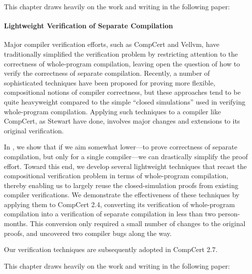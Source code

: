 
This chapter draws heavily on the work and writing in the following paper:



\paragraph{Lightweight Verification of Separate Compilation}

Major compiler verification efforts, such as CompCert and Vellvm, have traditionally simplified the
verification problem by restricting attention to the correctness of whole-program compilation,
leaving open the question of how to verify the correctness of separate compilation.  Recently, a
number of sophisticated techniques have been proposed for proving more flexible, compositional
notions of compiler correctness, but these approaches tend to be quite heavyweight compared to the
simple ``closed simulations'' used in verifying whole-program compilation.  Applying such techniques
to a compiler like CompCert, as Stewart \etal{} have done, involves major changes and extensions to
its original verification.

In , we show that if we aim somewhat lower---to prove correctness of separate
compilation, but only for a single compiler---we can drastically simplify the proof effort.  Toward
this end, we develop several lightweight techniques that recast the compositional verification
problem in terms of whole-program compilation, thereby enabling us to largely reuse the
closed-simulation proofs from existing compiler verifications.  We demonstrate the effectiveness of
these techniques by applying them to CompCert 2.4, converting its verification of whole-program
compilation into a verification of separate compilation in less than two person-months.  This
conversion only required a small number of changes to the original proofs, and uncovered two
compiler bugs along the way.

Our verification techniques are subsequently adopted in CompCert 2.7.

This chapter draws heavily on the work and writing in the following paper:


